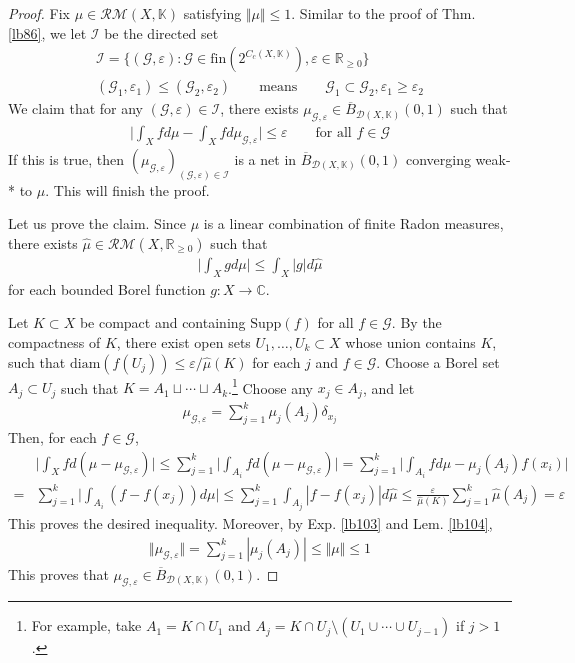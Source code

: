 \documentclass[12pt,b5paper,notitlepage]{article}
\theoremstyle{definition}
\theoremstyle{plain}
\newcommand{\wht}{\widehat}
\newcommand{\ovl}{\overline}
\newcommand{\scr}{\mathscr}
\newcommand{\Kbb}{\mathbb K}
\newcommand{\Cbb}{\mathbb C}
\newcommand{\Rbb}{\mathbb R}
\newcommand{\fin}{\mathrm{fin}}
\newcommand{\Supp}{\mathrm{Supp}}
\newcommand{\diam}{\mathrm{diam}}
\newcommand{\eps}{\varepsilon}
\newcommand{\MG}{\mathcal G}
\newcommand{\MD}{\mathcal D}
\newcommand{\RM}{\mathcal {RM}}
\numberwithin{equation}{section}
\begin{document}
\begin{proof}
Fix $\mu\in\RM(X,\Kbb)$ satisfying $\Vert\mu\Vert\leq 1$. Similar to the proof of Thm. \ref{lb86}, we let $\scr I$ be the directed set
\begin{gather*}
\scr I=\{(\MG,\eps):\MG\in\fin(2^{C_c(X,\Kbb)}),\eps\in\Rbb_{\geq0}\}\\
(\MG_1,\eps_1)\leq(\MG_2,\eps_2)\qquad\text{means}\qquad \MG_1\subset\MG_2,\eps_1\geq\eps_2
\end{gather*}
We claim that for any $(\MG,\eps)\in\scr I$, there exists $\mu_{\MG,\eps}\in\ovl B_{\MD(X,\Kbb)}(0,1)$ such that
\begin{align*}
\Big|\int_X fd\mu-\int_X fd\mu_{\MG,\eps}\Big |\leq\eps\qquad\text{for all }f\in\MG
\end{align*}
If this is true, then $(\mu_{\MG,\eps})_{(\MG,\eps)\in\scr I}$ is a net in $\ovl B_{\MD(X,\Kbb)}(0,1)$ converging weak-* to $\mu$. This will finish the proof.

Let us prove the claim. Since $\mu$ is a linear combination of finite Radon measures, there exists $\wht\mu\in\RM(X,\Rbb_{\geq0})$ such that
\begin{align*}
\Big|\int_X gd\mu\Big|\leq\int_X |g|d\wht\mu
\end{align*}
for each bounded Borel function $g:X\rightarrow\Cbb$.

Let $K\subset X$ be compact and containing $\Supp(f)$ for all $f\in\MG$. By the compactness of $K$, there exist open sets $U_1,\dots,U_k\subset X$ whose union contains $K$, such that $\diam(f(U_j))\leq \eps/\wht\mu(K)$ for each $j$ and $f\in\MG$. Choose a Borel set $A_j\subset U_j$ such that  $K=A_1\sqcup\cdots\sqcup A_k$.\footnote{For example, take $A_1=K\cap U_1$ and $A_j=K\cap U_j\setminus (U_1\cup\cdots\cup U_{j-1})$ if $j>1$.} Choose any $x_j\in A_j$, and let
\begin{align}\label{eq56}
\mu_{\MG,\eps}=\sum_{j=1}^k\mu_j(A_j)\delta_{x_j}
\end{align}
Then, for each $f\in\MG$,
\begin{align*}
&\Big| \int_X fd(\mu-\mu_{\MG,\eps})\Big|\leq\sum_{j=1}^k\Big|\int_{A_i}fd(\mu-\mu_{\MG,\eps})\Big|=\sum_{j=1}^k\Big|\int_{A_i}fd\mu -\mu_j(A_j)f(x_i)\Big|\\
=&\sum_{j=1}^k\Big|\int_{A_i}(f-f(x_j))d\mu\Big|\leq\sum_{j=1}^k\int_{A_j}|f-f(x_j)|d\wht\mu\leq \frac{\eps}{\wht\mu(K)}\sum_{j=1}^k\wht\mu(A_j)=\eps
\end{align*}
This proves the desired inequality. Moreover, by Exp. \ref{lb103} and Lem. \ref{lb104},
\begin{align*}
\Vert\mu_{\MG,\eps}\Vert=\sum_{j=1}^k|\mu_j(A_j)|\leq\Vert\mu\Vert\leq1
\end{align*}
This proves that $\mu_{\MG,\eps}\in\ovl B_{\MD(X,\Kbb)}(0,1)$.
\end{proof}
\end{document}
